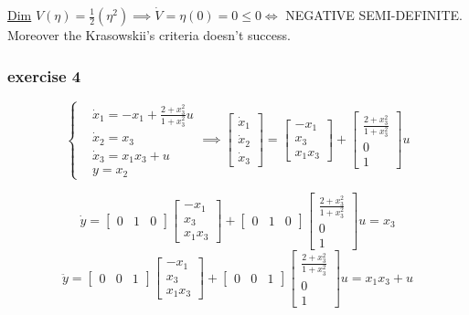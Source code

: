 \underline{Dim} $V(\eta) = \frac{1}{2}(\eta^2) \implies \dot{V} = \eta(0) = 0 \leq 0 \iff$ NEGATIVE SEMI-DEFINITE. Moreover the Krasowskii's criteria doesn't success.

\subsubsection{exercise 4}

\[
	\left\{
	\begin{aligned}
	&\dot{x}_1 = -x_1 + \frac{2+x_3^2}{1+x_3^2}u \\
	&\dot{x}_2 = x_3 \\
	&\dot{x}_3 = x_1x_3 + u\\
	&y=x_2
	\end{aligned}
	\right. \implies \begin{bmatrix}\dot{x}_1\\ \dot{x}_2 \\ \dot{x}_3\end{bmatrix} = \begin{bmatrix}-x_1\\x_3\\x_1x_3\end{bmatrix} + \begin{bmatrix}\frac{2+x_3^2}{1+x_3^2}\\0\\1\end{bmatrix}u
\]

\[
	\dot{y} = \begin{bmatrix}0&1&0\end{bmatrix}\begin{bmatrix}-x_1\\x_3\\x_1x_3\end{bmatrix} + \begin{bmatrix}0&1&0\end{bmatrix}\begin{bmatrix}\frac{2+x_3^2}{1+x_3^2}\\0\\1\end{bmatrix}u = x_3
\]
\[
	\ddot{y} = \begin{bmatrix}0&0&1\end{bmatrix}\begin{bmatrix}-x_1\\x_3\\x_1x_3\end{bmatrix} + \begin{bmatrix}0&0&1\end{bmatrix}\begin{bmatrix}\frac{2+x_3^2}{1+x_3^2}\\0\\1\end{bmatrix}u = x_1x_3 + u
\]

